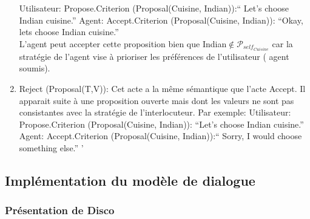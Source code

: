\documentclass[a4paper,french]{article}
\begin{document}
\begin{enumerate}
		\subitem Utilisateur: Propose.Criterion (Proposal(Cuisine, Indian)):`` Let's choose Indian cuisine.''
		\subitem Agent: Accept.Criterion (Proposal(Cuisine, Indian)): ``Okay, lets choose Indian cuisine.''
		\\L'agent peut accepter cette proposition bien que Indian$\notin \mathcal{P}_{self_{Cuisine}}$ car la stratégie de l'agent vise à prioriser  les préférences de l'utilisateur ( agent soumis).
		\\	
		\item Reject (Proposal(T,V)): Cet acte a la même sémantique que l'acte Accept. Il apparait suite à une proposition ouverte mais dont les valeurs ne sont pas consistantes avec la stratégie de l'interlocuteur. Par exemple: 
		\subitem Utilisateur: Propose.Criterion (Proposal(Cuisine, Indian)): ``Let's choose Indian cuisine.'' 
		\subitem Agent: Accept.Criterion (Proposal(Cuisine, Indian)):`` Sorry, I would choose something else.'' ' 
	
\end{enumerate}

\subsection{Implémentation du modèle de dialogue}

\subsubsection{Présentation de Disco}
\end{document}
